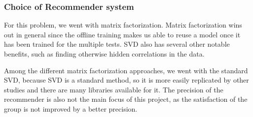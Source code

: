 \subsubsection{Choice of Recommender system}\label{sec:decision} %
For this problem, we went with matrix factorization. Matrix factorization wins out in general since the offline training makes us able to reuse a model once it has been trained for the multiple tests. SVD also has several other notable benefits, such as finding otherwise hidden correlations in the data.

Among the different matrix factorization approaches, we went with the standard SVD, because SVD is a standard method, so it is more easily replicated by other studies and there are many libraries available for it. The precision of the recommender is also not the main focus of this project, as the satisfaction of the group is not improved by a better precision.